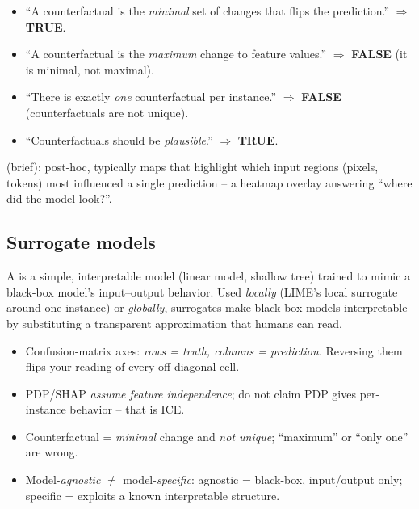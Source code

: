 \begin{exambox}
\begin{itemize}
  \item ``A counterfactual is the \emph{minimal} set of changes that flips the
    prediction.'' $\Rightarrow$ \textbf{TRUE}.
  \item ``A counterfactual is the \emph{maximum} change to feature values.''
    $\Rightarrow$ \textbf{FALSE} (it is minimal, not maximal).
  \item ``There is exactly \emph{one} counterfactual per instance.''
    $\Rightarrow$ \textbf{FALSE} (counterfactuals are not unique).
  \item ``Counterfactuals should be \emph{plausible}.'' $\Rightarrow$
    \textbf{TRUE}.
\end{itemize}
\end{exambox}

 (brief): post-hoc, typically  maps
that highlight which input regions (pixels, tokens) most influenced a single
prediction -- a heatmap overlay answering ``where did the model look?''.

\subsection{Surrogate models}

A  is a simple, interpretable model (linear model, shallow
tree) trained to mimic a black-box model's input--output behavior. Used
\emph{locally} (LIME's local surrogate around one instance) or \emph{globally},
surrogates make black-box models interpretable by substituting a transparent
approximation that humans can read.

\begin{pitfall}
\begin{itemize}
  \item Confusion-matrix axes: \emph{rows = truth, columns = prediction}.
    Reversing them flips your reading of every off-diagonal cell.
  \item PDP/SHAP \emph{assume feature independence}; do not claim PDP gives
    per-instance behavior -- that is ICE.
  \item Counterfactual = \emph{minimal} change and \emph{not unique}; ``maximum''
    or ``only one'' are wrong.
  \item Model-\emph{agnostic} $\ne$ model-\emph{specific}: agnostic = black-box,
    input/output only; specific = exploits a known interpretable structure.
\end{itemize}
\end{pitfall}
